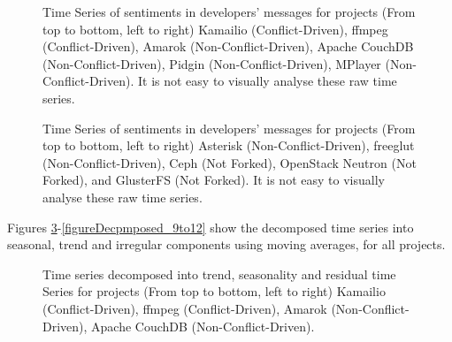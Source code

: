 \documentclass[12pt,letterpaper]{gthesis2}  %
\begin{document}
\begin{figure}[!htbp]
\caption{Time Series of sentiments in developers' messages for projects (From top to bottom, left to right) Kamailio (Conflict-Driven), ffmpeg (Conflict-Driven), Amarok (Non-Conflict-Driven), Apache CouchDB (Non-Conflict-Driven), Pidgin (Non-Conflict-Driven), MPlayer (Non-Conflict-Driven). It is not easy to visually analyse these raw time series.}
\label{figureTS_1to6}
\end{figure}


\begin{figure}[!htbp]
\caption{Time Series of sentiments in developers' messages for projects (From top to bottom, left to right) Asterisk (Non-Conflict-Driven), freeglut (Non-Conflict-Driven), Ceph (Not Forked), OpenStack Neutron (Not Forked), and GlusterFS (Not Forked). It is not easy to visually analyse these raw time series.}
\label{figureTS_7to12}
\end{figure}

Figures \ref{figureDecpmposed_1to4}-\ref{figureDecpmposed_9to12} show the decomposed time series into seasonal, trend and irregular components using moving averages, for all projects. 

\begin{figure}[!htbp]
\hspace{6ex}
\vspace{6ex}
\vspace{6ex}
\hspace{6ex}
\caption{Time series decomposed into trend, seasonality and residual time Series for projects (From top to bottom, left to right) Kamailio (Conflict-Driven), ffmpeg (Conflict-Driven), Amarok (Non-Conflict-Driven), Apache CouchDB (Non-Conflict-Driven).}
\label{figureDecpmposed_1to4}
\end{figure}
\end{document}
